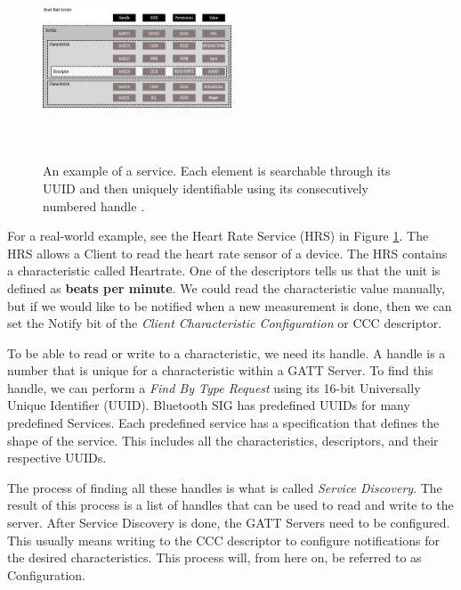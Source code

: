 \begin{figure}[]
    \centering
    \includegraphics[width=0.5\textwidth,height=6cm,keepaspectratio=true]{images/heartrate_service}
    \caption{
        An example of a service. Each element is searchable through its UUID and then uniquely identifiable using its consecutively numbered handle \cite{townsend_cufi}.
    }
    \label{fig:hrs_layout}
\end{figure}
For a real-world example, see the Heart Rate Service (HRS) in Figure \ref{fig:hrs_layout}. The HRS allows a Client to read the heart rate sensor of a device. The HRS contains a characteristic called Heartrate. One of the descriptors tells us that the unit is defined as \textbf{beats per minute}. We could read the characteristic value manually, but if we would like to be notified when a new measurement is done, then we can set the Notify bit of the \textit{Client Characteristic Configuration} or CCC descriptor.

To be able to read or write to a characteristic, we need its handle. A handle is a number that is unique for a characteristic within a GATT Server. To find this handle, we can perform a \textit{Find By Type Request} using its 16-bit Universally Unique Identifier (UUID). Bluetooth SIG has predefined UUIDs for many predefined Services. Each predefined service has a specification that defines the shape of the service. This includes all the characteristics, descriptors, and their respective UUIDs.

The process of finding all these handles is what is called \textit{Service Discovery}. The result of this process is a list of handles that can be used to read and write to the server. After Service Discovery is done, the GATT Servers need to be configured. This usually means writing to the CCC descriptor to configure notifications for the desired characteristics. This process will, from here on, be referred to as Configuration. 

